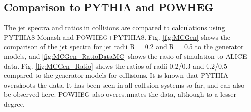 \subsection{Comparison to PYTHIA and POWHEG}
\label{sec:mcComparison}

The jet spectra and ratios in \pp collisions are compared to calculations using PYTHIA8 Monash and POWHEG+PYTHIA8. Fig. \ref{fig:MCGen} shows the comparison of the \pp jet spectra for jet radii R = 0.2 and R = 0.5 to the generator models, and \ref{fig:MCGen_RatioDataMC} shows the ratio of simulation to \pp ALICE data. Fig. \ref{fig:MCGen_Ratio} shows the ratios of radii 0.2/0.3 and 0.2/0.5 compared to the generator models for \pp collisions. It is known that PYTHIA overshoots the \pp data. It has been seen in all collision systems so far, and can also be observed here. POWHEG also overestimates the data, although to a lesser degree.

